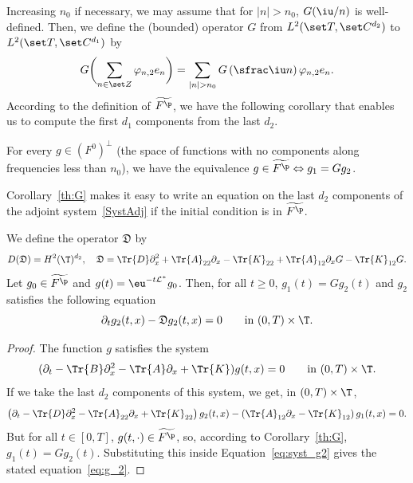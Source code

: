 Increasing $n_0$ if necessary, we may assume that for $|n|> n_0$, $G(\iu/n)$ is well-defined. Then, we define the (bounded) operator $G$ from $L^2(\set T,\set C^{d_2})$ to $L^2(\set T, \set C^{d_1})$ by
\begin{equation}\label{eq:G}
G\biggl(\sum_{n\in \set Z} \varphi_{n,2} e_n\biggr) = \sum_{|n|>n_0} G\left(\sfrac \iu n\right) \varphi_{n,2} e_n.
\end{equation}
According to the definition of $\widetilde{F^\p}$, we have the following corollary that enables us to compute the first $d_1$ components from the last $d_2$.
\begin{corollary}\label{th:G}
For every $g\in (F^0)^\perp$ (the space of functions with no components along frequencies less than $n_0$), we have the equivalence $g\in \widetilde{F^\p} \Leftrightarrow g_1 = Gg_2$.
\end{corollary}

Corollary~\ref{th:G} makes it easy to write an equation on the last $d_2$ components of the adjoint system~\eqref{SystAdj} if the initial condition is in $\widetilde{F^\p}$.
\begin{prop}\label{LemEquationg2}
We define the operator $\mathfrak{D}$ by
\begin{equation}\label{eq:d'}
D(\mathfrak{D})= H^2(\T)^{d_2}, \quad \mathfrak{D} = \Tr{D} \partial_x^2 + \Tr{A}_{22}\partial_x - \Tr{K}_{22} + \Tr{A}_{12} \partial_x G - \Tr{K}_{12}G.
\end{equation}
Let $g_0 \in \widetilde{F^\p}$ and $g(t) = \eu^{-t\mathcal L^\ast} g_0$. Then, for all $t\geq 0$, $g_1(t) = G g_2(t)$ and $g_2$ satisfies the following equation
\begin{equation}\label{eq:g_2}
\partial_t g_2(t,x) - \mathfrak{D} g_2(t,x) = 0\qquad \text{in}\ (0,T)\times\T.
\end{equation}
\end{prop}

\begin{proof}
The function $g$ satisfies the system
\[
(\partial_t - \Tr{B}\partial_x^2 - \Tr{A} \partial_x + \Tr{K})g(t,x) = 0\qquad \text{in}\ (0,T)\times\T.
\]
If we take the last $d_2$ components of this system, we get, in $(0,T)\times\T$,
\begin{equation}\label{eq:syst_g2}
\left(\partial_t - \Tr{D}\partial_x^2 - \Tr{A}_{22}\partial_x + \Tr{K}_{22} \right) g_2(t,x) - \left(\Tr{A}_{12}\partial_x - \Tr{K}_{12} \right) g_1(t,x) = 0.
\end{equation}
But for all $t \in [0,T]$, $g(t,\cdot)\in \widetilde{F^\p}$, so, according to Corollary~\ref{th:G}, $g_1(t) = Gg_2(t)$. Substituting this inside Equation~\eqref{eq:syst_g2} gives the stated equation~\eqref{eq:g_2}.
\end{proof}


